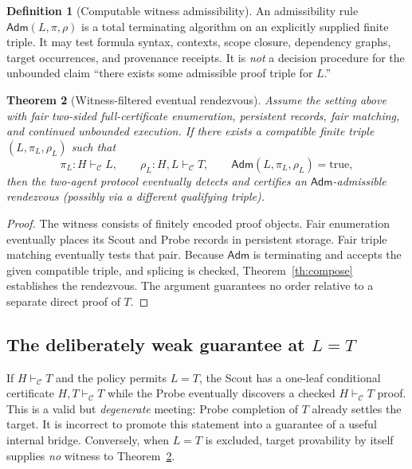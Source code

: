 \documentclass[11pt,letterpaper]{article}
\newtheorem{theorem}{Theorem}[section]
\theoremstyle{definition}
\newtheorem{definition}[theorem]{Definition}
\newcommand{\vdC}{\vdash_{\mathcal C}}
\newcommand{\Adm}{\mathsf{Adm}}
\begin{document}
\begin{definition}[Computable witness admissibility]
An admissibility rule $\Adm(L,\pi,\rho)$ is a total terminating algorithm
on an explicitly supplied finite triple. It may test formula syntax,
contexts, scope closure, dependency graphs, target occurrences, and
provenance receipts. It is \emph{not} a decision procedure for the
unbounded claim ``there exists some admissible proof triple for $L$.''
\end{definition}

\begin{theorem}[Witness-filtered eventual rendezvous]\label{th:witness}
Assume the setting above with fair two-sided \emph{full-certificate}
enumeration, persistent records, fair matching, and continued unbounded
execution. If there exists a compatible finite triple $(L,\pi_L,\rho_L)$
such that
\[
 \pi_L:H\vdC L,\qquad \rho_L:H,L\vdC T,
 \qquad \Adm(L,\pi_L,\rho_L)=\mathrm{true},
\]
then the two-agent protocol eventually detects and certifies an
$\Adm$-admissible rendezvous (possibly via a different qualifying triple).
\end{theorem}
\begin{proof}
The witness consists of finitely encoded proof objects. Fair enumeration
eventually places its Scout and Probe records in persistent storage.
Fair triple matching eventually tests that pair. Because $\Adm$ is
terminating and accepts the given compatible triple, and splicing is
checked, Theorem~\ref{th:compose} establishes the rendezvous. The
argument guarantees no order relative to a separate direct proof of $T$.
\end{proof}

\subsection{The deliberately weak guarantee at $L=T$}
If $H\vdC T$ and the policy permits $L=T$, the Scout has a one-leaf
conditional certificate $H,T\vdC T$ while the Probe eventually discovers
a checked $H\vdC T$ proof. This is a valid but \emph{degenerate} meeting:
Probe completion of $T$ already settles the target. It is incorrect to
promote this statement into a guarantee of a useful internal bridge.
Conversely, when $L=T$ is excluded, target provability by itself supplies
\emph{no} witness to Theorem~\ref{th:witness}.
\end{document}
